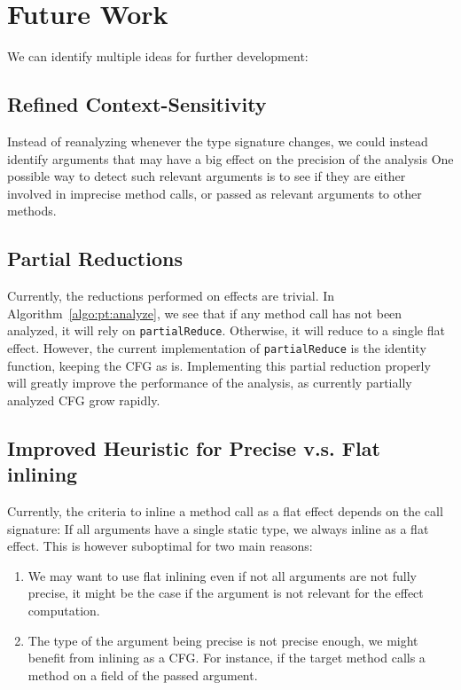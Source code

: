 \documentclass[a4paper]{article}
\begin{document}
\section{Future Work}
We can identify multiple ideas for further development:

\subsection{Refined Context-Sensitivity}
Instead of reanalyzing whenever the type signature changes, we could instead
identify arguments that may have a big effect on the precision of the analysis
One possible way to detect such relevant arguments is to see if they are either
involved in imprecise method calls, or passed as relevant arguments to other
methods.

\subsection{Partial Reductions}
Currently, the reductions performed on effects are trivial. In
Algorithm~\ref{algo:pt:analyze}, we see that if any method call has not been
analyzed, it will rely on \verb=partialReduce=. Otherwise, it will reduce to a
single flat effect. However, the current implementation of \verb=partialReduce=
is the identity function, keeping the CFG as is. Implementing this partial
reduction properly will greatly improve the performance of the analysis, as
currently partially analyzed CFG grow rapidly.

\subsection{Improved Heuristic for Precise v.s. Flat inlining}
Currently, the criteria to inline a method call as a flat effect depends on the
call signature: If all arguments have a single static type, we always inline as
a flat effect. This is however suboptimal for two main reasons:
\begin{enumerate}
    \item We may want to use flat inlining even if not all arguments are not fully
precise, it might be the case if the argument is not relevant for the effect
computation.
    \item The type of the argument being precise is not precise enough, we might
benefit from inlining as a CFG. For instance, if the target method calls a
method on a field of the passed argument.
\end{enumerate}
\end{document}
